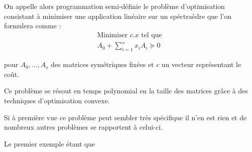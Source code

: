 On appelle alors programmation semi-définie le problème d'optimisation consistant à minimiser une application linéaire sur un spéctraèdre que l'on formulera comme :
\begin{equation}
	\tag{PSD}
	\begin{matrix}
		\text{Minimiser } c.x \text{ tel que}\\
		A_0 + \sum \limits_{i=1}^s x_{i}A_{i} \succeq 0
	\end{matrix}
	\label{Psd} 
\end{equation}

pour $A_0,\ldots, A_s$ des matrices symétriques fixées et $c$ un vecteur représentant le coût.

Ce problème se résout en temps polynomial en la taille des matrices grâce à des techniques d'optimisation convexe. 

Si à première vue ce problème peut sembler très spécifique il n'en est rien et de nombreux autres problèmes se rapportent à celui-ci.

Le premier exemple étant que 
